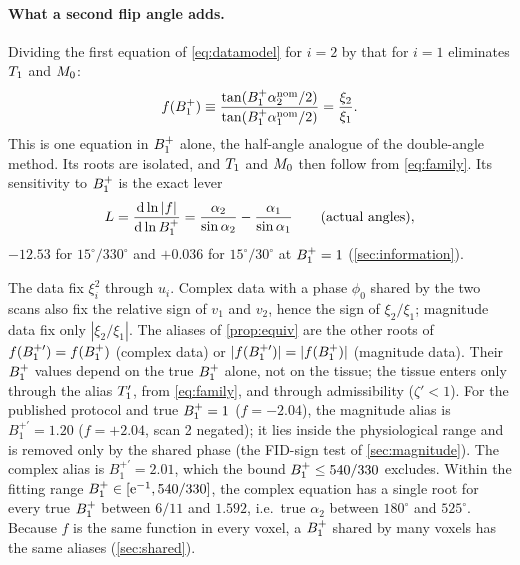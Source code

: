 \paragraph{What a second flip angle adds.} Dividing the first equation of \eqref{eq:datamodel} for
$i=2$ by that for $i=1$ eliminates $T_1$ and $M_0$:
\begin{equation}
  f(B_1^{+})\equiv\frac{\tan(B_1^{+}\alpha_2^{\rm nom}/2)}{\tan(B_1^{+}\alpha_1^{\rm nom}/2)}=\frac{\xi_2}{\xi_1}.
  \label{eq:secondscan}
\end{equation}
This is one equation in $B_1^{+}$ alone, the half-angle analogue of the double-angle method. Its roots
are isolated, and $T_1$ and $M_0$ then follow from \eqref{eq:family}. Its sensitivity to $B_1^{+}$ is
the exact lever
\begin{equation}
  L=\frac{\mathrm d\ln|f|}{\mathrm d\ln B_1^{+}}=\frac{\alpha_2}{\sin\alpha_2}-\frac{\alpha_1}{\sin\alpha_1}
  \qquad(\text{actual angles}),
  \label{eq:leverexact}
\end{equation}
$-12.53$ for $15^\circ/330^\circ$ and $+0.036$ for $15^\circ/30^\circ$ at $B_1^{+}=1$ (\cref{sec:information}).

The data fix $\xi_i^2$ through $u_i$. Complex data with a phase $\phi_0$ shared by the two scans also fix
the relative sign of $v_1$ and $v_2$, hence the sign of $\xi_2/\xi_1$; magnitude data fix only
$|\xi_2/\xi_1|$. The aliases of \cref{prop:equiv} are the other roots of $f(B_1^{+\prime})=f(B_1^{+})$ (complex
data) or $|f(B_1^{+\prime})|=|f(B_1^{+})|$ (magnitude data). Their $B_1^{+}$ values depend on the true $B_1^{+}$ alone,
not on the tissue; the tissue enters only through the alias $T_1'$, from \eqref{eq:family}, and
through admissibility ($\zeta'<1$). For the published protocol and true $B_1^{+}=1$ ($f=-2.04$), the
magnitude alias is $B_1^{+\prime}=1.20$ ($f=+2.04$, scan 2 negated); it lies inside the physiological range and
is removed only by the shared phase (the FID-sign test of \cref{sec:magnitude}). The complex alias
is $B_1^{+\prime}=2.01$, which the bound $B_1^{+}\le540/330$ excludes. Within the fitting range
$B_1^{+}\in[\mathrm{e}^{-1},540/330]$, the complex equation has a single root for every true $B_1^{+}$ between $6/11$ and
$1.592$, i.e.\ true $\alpha_2$ between $180^\circ$ and $525^\circ$. Because $f$ is the same function in every
voxel, a $B_1^{+}$ shared by many voxels has the same aliases (\cref{sec:shared}).

